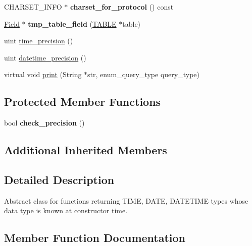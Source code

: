 \begin{DoxyCompactItemize}
\item 
\mbox{\label{classItem__temporal__func_aaef968e59355e1f4a2c24ecdccc58af2}} 
C\+H\+A\+R\+S\+E\+T\+\_\+\+I\+N\+FO $\ast$ {\bfseries charset\+\_\+for\+\_\+protocol} () const
\item 
\mbox{\label{classItem__temporal__func_a62943e93f45cf0bd27cce4b5c4075509}} 
\mbox{\hyperlink{classField}{Field}} $\ast$ {\bfseries tmp\+\_\+table\+\_\+field} (\mbox{\hyperlink{structTABLE}{T\+A\+B\+LE}} $\ast$table)
\item 
uint \mbox{\hyperlink{classItem__temporal__func_a78c81ac3504e8cc63f3743bee366f3f2}{time\+\_\+precision}} ()
\item 
uint \mbox{\hyperlink{classItem__temporal__func_ad8de60fc778a47b3e3c14df2ef3d8f38}{datetime\+\_\+precision}} ()
\item 
virtual void \mbox{\hyperlink{classItem__temporal__func_a2d5c593d44864f0d0744dd6c6a00f6ac}{print}} (String $\ast$str, enum\+\_\+query\+\_\+type query\+\_\+type)
\end{DoxyCompactItemize}
\subsection*{Protected Member Functions}
\begin{DoxyCompactItemize}
\item 
\mbox{\label{classItem__temporal__func_a92fdbfc9e4a8b5437b28afaaf67671e1}} 
bool {\bfseries check\+\_\+precision} ()
\end{DoxyCompactItemize}
\subsection*{Additional Inherited Members}


\subsection{Detailed Description}
Abstract class for functions returning T\+I\+ME, D\+A\+TE, D\+A\+T\+E\+T\+I\+ME types whose data type is known at constructor time. 

\subsection{Member Function Documentation}
\mbox{\label{classItem__temporal__func_ad8de60fc778a47b3e3c14df2ef3d8f38}} 
